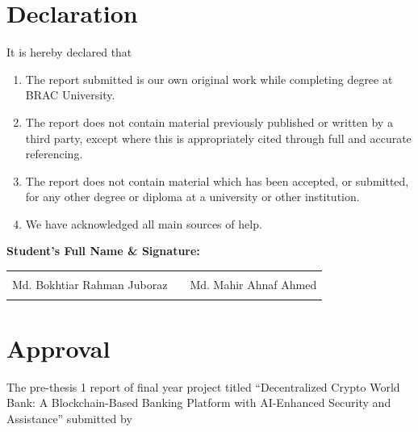 \documentclass[12pt,a4paper]{report}
\begin{document}
\newpage
\thispagestyle{empty}

\chapter*{Declaration}
{}

It is hereby declared that

\begin{enumerate}
\item The report submitted is our own original work while completing degree at BRAC University.
\item The report does not contain material previously published or written by a third party, except where this is appropriately cited through full and accurate referencing.
\item The report does not contain material which has been accepted, or submitted, for any other degree or diploma at a university or other institution.
\item We have acknowledged all main sources of help.
\end{enumerate}

\vspace{2cm}

\textbf{Student's Full Name \& Signature:}

\vspace{2cm}

\begin{tabularx}{\linewidth}{@{}L{5.5cm}C{1.0cm}L{5.5cm}@{}}
\hrulefill & & \hrulefill \\
\centering Md. Bokhtiar Rahman Juboraz & & \centering Md. Mahir Ahnaf Ahmed \tabularnewline
{} & &  \tabularnewline
\end{tabularx}

\newpage
\thispagestyle{empty}

\chapter*{Approval}
{}

The pre-thesis 1 report of final year project titled ``Decentralized Crypto World Bank: A Blockchain-Based Banking Platform with AI-Enhanced Security and Assistance'' submitted by
\end{document}
